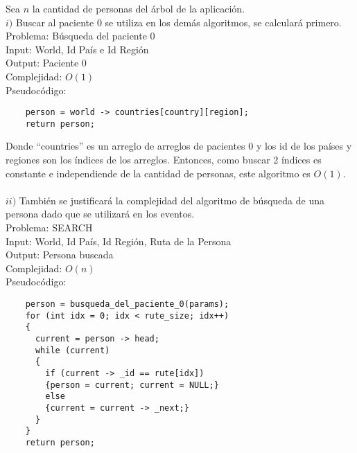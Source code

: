 \documentclass[letter]{article}
\begin{document}
	\begin{encabezado}
	\end{encabezado}
	
	\begin{parte}{1}
		
	Sea $n$ la cantidad de personas del árbol de la aplicación.\\
	
	\noindent
	$i)$ Buscar al paciente 0 se utiliza en los demás algoritmos, se calculará primero.\\
	
	\noindent
	Problema: Búsqueda del paciente 0\\
	Input: World, Id País e Id Región\\
	Output: Paciente 0\\
	Complejidad: $O(1)$\\
	Pseudocódigo:
	
	\begin{lstlisting}
	person = world -> countries[country][region];
	return person;
	\end{lstlisting}
	\vspace{0.2cm}

	Donde ``countries'' es un arreglo de arreglos de pacientes 0 y los id de los países y regiones son los índices de los arreglos. Entonces, como buscar 2 índices es constante e independiende de la cantidad de personas, este algoritmo es $O(1)$.\\\\
	
	\noindent
	$ii)$ También se justificará la complejidad del algoritmo de búsqueda de una persona dado que se utilizará en los eventos.\\
	
	\noindent
	Problema: SEARCH\\
	Input: World, Id País, Id Región, Ruta de la Persona\\
	Output: Persona buscada\\
	Complejidad: $O(n)$\\
	Pseudocódigo:
	
	\begin{lstlisting}
	person = busqueda_del_paciente_0(params);
	for (int idx = 0; idx < rute_size; idx++)
	{
	  current = person -> head;
	  while (current)
	  {
  	    if (current -> _id == rute[idx])
  	    {person = current; current = NULL;}
  	    else
	    {current = current -> _next;}
	  }
	}
	return person;
	\end{lstlisting}
	\vspace{0.2cm}
	

\end{parte}
\end{document}
